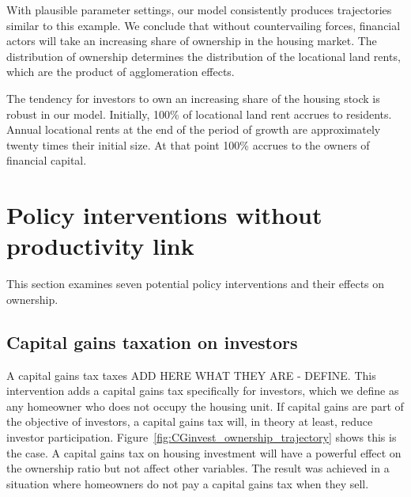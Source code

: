 {With plausible parameter settings, our model consistently produces trajectories similar to this example. We conclude that without countervailing forces, financial actors will take an increasing share of ownership in the housing market. 
The distribution of ownership determines the distribution of the locational land rents, which are the product of agglomeration effects. 

The tendency for investors to own an increasing share of the housing stock is robust in our model. 
Initially, 100\% of locational land rent accrues to residents.   Annual locational rents at the end of the period of growth are approximately twenty times their initial size. At that point 100\% accrues to the owners of financial capital. %

}

\section{Policy interventions without productivity link}


This section examines seven potential policy interventions and their effects on ownership. 

\newpage
\subsection{Capital gains taxation on investors}

A capital gains tax taxes {\color{red} ADD HERE WHAT THEY ARE - DEFINE}. This intervention adds a capital gains tax specifically for investors, which we define as any homeowner who does not occupy the housing unit. If capital gains are part of the objective of investors, a capital gains tax will, in theory at least, reduce investor participation. Figure~\ref{fig:CGinvest_ownership_trajectory} shows this is the case. A capital gains tax on housing investment will have a powerful effect on the ownership ratio but not affect other variables. The result was achieved in a situation where homeowners do not pay a capital gains tax when they sell. 

